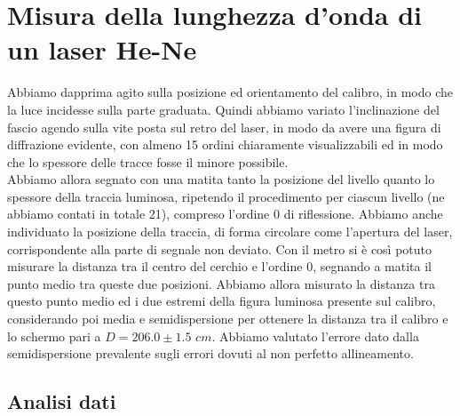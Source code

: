 \section{Misura della lunghezza d'onda di un laser He-Ne}

Abbiamo dapprima agito sulla posizione ed orientamento del calibro, in modo che la luce incidesse sulla parte graduata. Quindi abbiamo variato l'inclinazione del fascio agendo sulla vite posta sul retro del laser, in modo da avere una figura di diffrazione evidente, con almeno 15 ordini chiaramente visualizzabili ed in modo che lo spessore delle tracce fosse il minore possibile.\\
Abbiamo allora segnato con una matita tanto la posizione del livello quanto lo spessore della traccia luminosa, ripetendo il procedimento per ciascun livello (ne abbiamo contati in totale 21), compreso l'ordine 0 di riflessione. Abbiamo anche individuato la posizione della traccia, di forma circolare come l'apertura del laser, corrispondente alla parte di segnale non deviato. Con il metro si è così potuto misurare la distanza tra il centro del cerchio e l'ordine 0, segnando a matita il punto medio tra queste due posizioni. Abbiamo allora misurato la distanza tra questo punto medio ed i due estremi della figura luminosa presente sul calibro, considerando poi media e semidispersione per ottenere la distanza tra il calibro e lo schermo pari a $D = 206.0 \pm 1.5$ $cm$. Abbiamo valutato l'errore dato dalla semidispersione prevalente sugli errori dovuti al non perfetto allineamento.

\subsection{Analisi dati}


